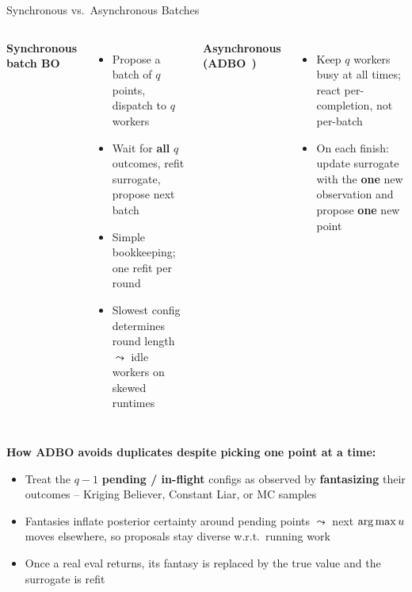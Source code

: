 \documentclass[main]{subfiles}
\begin{document}
\begin{frame}[t]{Synchronous vs.\ Asynchronous Batches}
  \footnotesize
  \begin{columns}[onlytextwidth,T]
      \textbf{Synchronous batch BO}
      \begin{itemize}\setlength\itemsep{0pt}
          \item Propose a batch of $q$ points, dispatch to $q$ workers
          \item Wait for \textbf{all} $q$ outcomes, refit surrogate, propose next batch
          \item Simple bookkeeping; one refit per round
          \item Slowest config determines round length $\leadsto$ idle workers on skewed runtimes
      \end{itemize}
      \textbf{Asynchronous (ADBO}~\textbf{)}
      \begin{itemize}\setlength\itemsep{0pt}
          \item Keep $q$ workers busy at all times; react per-completion, not per-batch
          \item On each finish: update surrogate with the \textbf{one} new observation and propose \textbf{one} new point
      \end{itemize}
  \end{columns}
  \vspace{0.2cm}
  \textbf{How ADBO avoids duplicates despite picking one point at a time:}
  \begin{itemize}\setlength\itemsep{0pt}
    \item Treat the $q\!-\!1$ \textbf{pending / in-flight} configs as observed by \textbf{fantasizing} their outcomes -- Kriging Believer, Constant Liar, or MC samples
    \item Fantasies inflate posterior certainty around pending points $\leadsto$ next $\operatorname*{arg\,max} u$ moves elsewhere, so proposals stay diverse w.r.t.\ running work
    \item Once a real eval returns, its fantasy is replaced by the true value and the surrogate is refit
  \end{itemize}
\end{frame}
\end{document}
